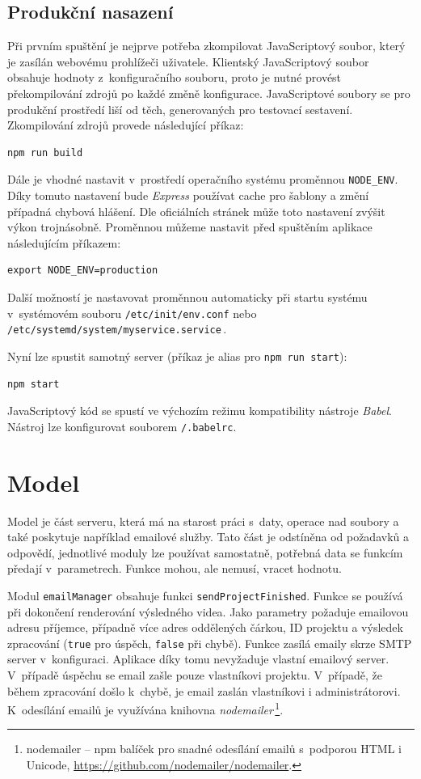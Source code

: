 \subsection{Produkční nasazení}
Při prvním spuštění je nejprve potřeba zkompilovat JavaScriptový soubor, který je zasílán webovému prohlížeči uživatele. Klientský JavaScriptový soubor obsahuje hodnoty z~konfiguračního souboru, proto je nutné provést překompilování zdrojů po každé změně konfigurace. JavaScriptové soubory se pro produkční prostředí liší od těch, generovaných pro testovací sestavení. Zkompilování zdrojů provede následující příkaz:
\begin{lstlisting}[style=bash]
npm run build
\end{lstlisting}

Dále je vhodné nastavit v~prostředí operačního systému proměnnou \texttt{NODE\_ENV}. Díky tomuto nastavení bude \textit{Express} používat cache pro šablony a změní případná chybová hlášení. Dle oficiálních stránek může toto nastavení zvýšit výkon trojnásobně. Proměnnou můžeme nastavit před spuštěním aplikace následujícím příkazem:
\begin{lstlisting}[style=bash]
export NODE_ENV=production
\end{lstlisting}
Další možností je nastavovat proměnnou automaticky při startu systému v~systémovém souboru \texttt{/etc/init/env.conf} nebo \texttt{/etc/systemd/system/myservice.service}\,\cite{express}.

Nyní lze spustit samotný server (příkaz je alias pro \texttt{npm run start}):
\begin{lstlisting}[style=bash]
npm start
\end{lstlisting}
JavaScriptový kód se spustí ve výchozím režimu kompatibility nástroje \textit{Babel}. Nástroj lze konfigurovat souborem \texttt{/.babelrc}.

\section{Model}
Model je část serveru, která má na starost práci s~daty, operace nad soubory a také poskytuje například emailové služby. Tato část je odstíněna od požadavků a odpovědí, jednotlivé moduly lze používat samostatně, potřebná data se funkcím předají v~parametrech. Funkce mohou, ale nemusí, vracet hodnotu.

Modul \texttt{emailManager} obsahuje funkci \texttt{sendProjectFinished}. Funkce se používá při dokončení renderování výsledného videa. Jako parametry požaduje emailovou adresu příjemce, případně více adres oddělených čárkou, ID projektu a výsledek zpracování (\texttt{true} pro úspěch, \texttt{false} při chybě). Funkce zasílá emaily skrze SMTP server v~konfiguraci. Aplikace díky tomu nevyžaduje vlastní emailový server. V~případě úspěchu se email zašle pouze vlastníkovi projektu. V~případě, že během zpracování došlo k~chybě, je email zaslán vlastníkovi i administrátorovi. K~odesílání emailů je využívána knihovna \textit{nodemailer}\,\footnote{nodemailer -- npm balíček pro snadné odesílání emailů s~podporou HTML i Unicode, \url{https://github.com/nodemailer/nodemailer}.}.

